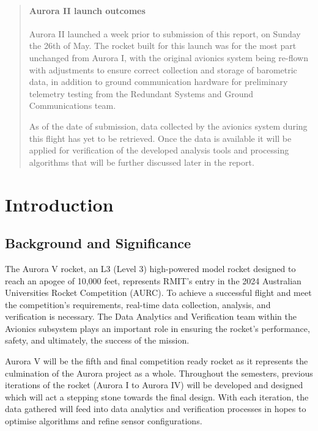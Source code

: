 \begin{abstract}
  \paragraph*{Aurora II launch outcomes} 
  Aurora II launched a week prior to submission of this report, on Sunday the 26th of May. The rocket built for this launch was for the most part unchanged from Aurora I, with the original avionics system being re-flown with adjustments to ensure correct collection and storage of barometric data, in addition to ground communication hardware for preliminary telemetry testing from the Redundant Systems and Ground Communications team. 

  As of the date of submission, data collected by the avionics system during this flight has yet to be retrieved. Once the data is available it will be applied for verification of the developed analysis tools and processing algorithms that will be further discussed later in the report.
\end{abstract}


\section{Introduction}
\subsection{Background and Significance}
The Aurora V rocket, an L3 (Level 3) high-powered model rocket designed to reach an apogee of 10,000 feet, represents RMIT's entry in the 2024 Australian Universities Rocket Competition (AURC). To achieve a successful flight and meet the competition's requirements, real-time data collection, analysis, and verification is necessary. The Data Analytics and Verification team within the Avionics subsystem plays an important role in ensuring the rocket's performance, safety, and ultimately, the success of the mission. 

Aurora V will be the fifth and final competition ready rocket as it represents the culmination of the Aurora project as a whole. Throughout the semesters, previous iterations of the rocket (Aurora I to Aurora IV) will be developed and designed which will act a stepping stone towards the final design. With each iteration, the data gathered will feed into data analytics and verification processes in hopes to optimise algorithms and refine sensor configurations.  

